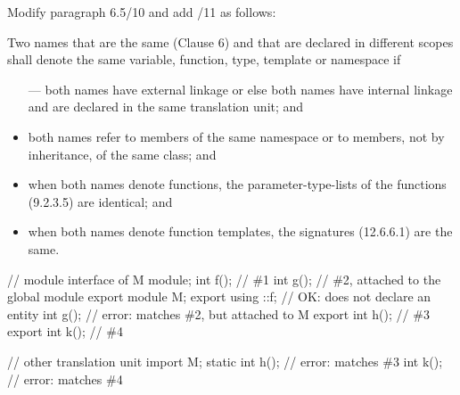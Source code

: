 \noindent
Modify paragraph 6.5/10 and add /11 as follows:
\begin{std.txt}
  \resetalinea[9]
  \alinea
  \addtocounter{footnote}{1}
  Two
  names that are the same (Clause 6) and that are declared in different scopes
  shall denote the same variable, function, type, template or namespace if
  \begin{itemize}
    \item[---] both names have external  linkage
      or else both names have internal linkage and are declared in
      the same translation unit; and

      \item both names refer to members of the same namespace or to members,
      not by inheritance, of the same class; and

      \item when both names denote functions, the parameter-type-lists of the
      functions (9.2.3.5) are identical; and

      \item when both names denote function templates, the signatures (12.6.6.1)
      are the same.
  \end{itemize}

  \alinea
  \color{addclr}
  \begin{example}
    \begin{codeblock}
      // module interface of M
      module;
      int f();            // \#1
      int g();            // \#2, attached to the global module
      export module M;
      export using ::f;   // OK: does not declare an entity
      int g();            // error: matches \#2, but attached to M
      export int h();     // \#3
      export int k();     // \#4

      // other translation unit
      import M;
      static int h();     // error: matches \#3
      int k();            // error: matches \#4
    \end{codeblock}
  \end{example}
\end{std.txt}



